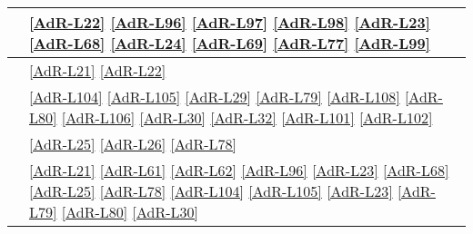 \begin{longtable}{|m{12cm}|>{\centering}m{2cm}|}
	\hline \coderef{BubbleAndEat::Customer::BubbleCustomer} & \ref{AdR-L22} \linebreak \ref{AdR-L96} \linebreak \ref{AdR-L97} \linebreak \ref{AdR-L98} \linebreak \ref{AdR-L23} \linebreak \ref{AdR-L68} \linebreak \ref{AdR-L24} \linebreak \ref{AdR-L69} \linebreak \ref{AdR-L77} \linebreak \ref{AdR-L99} \tabularnewline
	\hline \coderef{BubbleAndEat::Customer::Client} & \ref{AdR-L21} \linebreak \ref{AdR-L22} \tabularnewline
	\hline \coderef{BubbleAndEat::Restaurant::Manager::BubbleManager} & \ref{AdR-L104} \linebreak \ref{AdR-L105} \linebreak \ref{AdR-L29} \linebreak \ref{AdR-L79} \linebreak \ref{AdR-L108} \linebreak \ref{AdR-L80} \linebreak \ref{AdR-L106} \linebreak \ref{AdR-L30} \linebreak \ref{AdR-L32} \linebreak \ref{AdR-L101} \linebreak \ref{AdR-L102} \tabularnewline
	\hline \coderef{BubbleAndEat::Restaurant::Chef::BubbleChef} & \ref{AdR-L25} \linebreak \ref{AdR-L26} \linebreak \ref{AdR-L78} \tabularnewline
	\hline \coderef{BubbleAndEat::Restaurant::OrderGateway::OrderGateway} & \ref{AdR-L21} \linebreak \ref{AdR-L61} \linebreak \ref{AdR-L62} \linebreak \ref{AdR-L96} \linebreak \ref{AdR-L23} \linebreak \ref{AdR-L68} \linebreak \ref{AdR-L25} \linebreak \ref{AdR-L78} \linebreak \ref{AdR-L104} \linebreak \ref{AdR-L105} \linebreak \ref{AdR-L23} \linebreak \ref{AdR-L79} \linebreak \ref{AdR-L80} \linebreak \ref{AdR-L30} \tabularnewline

\end{longtable}
